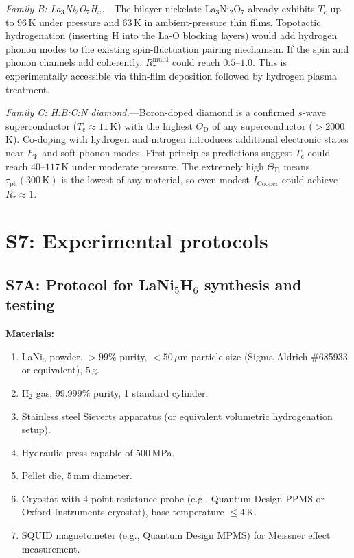 \documentclass[prb,twocolumn,superscriptaddress,longbibliography,floatfix]{revtex4-2}
\newcommand{\tauasym}{\tau}
\newcommand{\taudec}{\tauasym_{\mathrm{ph}}}
\newcommand{\Icoop}{I_{\mathrm{Cooper}}}
\newcommand{\Rtau}{R_{\tauasym}}
\newcommand{\Tc}{T_{\mathrm{c}}}
\newcommand{\EF}{E_{\mathrm{F}}}
\newcommand{\ThetaD}{\Theta_{\mathrm{D}}}
\begin{document}
\emph{Family B: La$_3$Ni$_2$O$_7$H$_x$.}---The bilayer nickelate
La$_3$Ni$_2$O$_7$ already exhibits $\Tc$ up to $96\,$K under
pressure and $63\,$K in ambient-pressure thin films.  Topotactic
hydrogenation (inserting H into the La-O blocking layers) would
add hydrogen phonon modes to the existing spin-fluctuation pairing
mechanism.  If the spin and phonon channels add coherently,
$\Rtau^{\mathrm{multi}}$ could reach $0.5$--$1.0$.  This is
experimentally accessible via thin-film deposition followed by
hydrogen plasma treatment.

\emph{Family C: H:B:C:N diamond.}---Boron-doped diamond is a
confirmed $s$-wave superconductor ($\Tc \approx 11\,$K) with the
highest $\ThetaD$ of any superconductor ($> 2000\,$K).  Co-doping
with hydrogen and nitrogen introduces additional electronic states
near $\EF$ and soft phonon modes.  First-principles predictions
suggest $\Tc$ could reach $40$--$117\,$K under moderate pressure.
The extremely high $\ThetaD$ means $\taudec(300\,\mathrm{K})$ is
the lowest of any material, so even modest $\Icoop$ could achieve
$\Rtau \approx 1$.

\section{S7: Experimental protocols}
\label{sec:S7}

\subsection{S7A: Protocol for LaNi$_5$H$_6$ synthesis and testing}

\textbf{Materials:}
\begin{enumerate}
\item LaNi$_5$ powder, $>99\%$ purity, $<50\,\mu$m particle size
  (Sigma-Aldrich \#685933 or equivalent), 5\,g.
\item H$_2$ gas, $99.999\%$ purity, 1 standard cylinder.
\item Stainless steel Sieverts apparatus (or equivalent
  volumetric hydrogenation setup).
\item Hydraulic press capable of $500\,$MPa.
\item Pellet die, $5\,$mm diameter.
\item Cryostat with 4-point resistance probe (e.g., Quantum Design
  PPMS or Oxford Instruments cryostat), base temperature $\leq 4\,$K.
\item SQUID magnetometer (e.g., Quantum Design MPMS) for
  Meissner effect measurement.
\end{enumerate}
\end{document}
